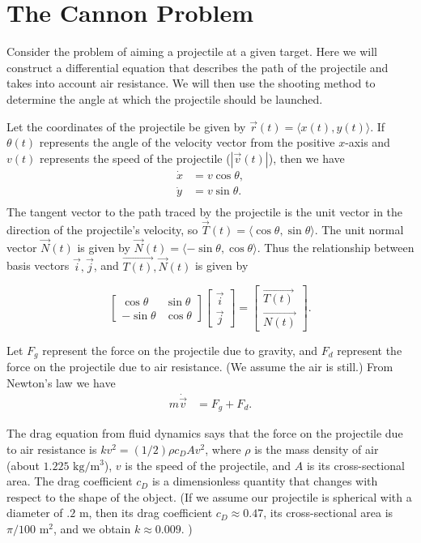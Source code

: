 
\section{The Cannon Problem}

Consider the problem of aiming a projectile at a given target. Here we will construct a differential equation that describes the path of the projectile and takes into account air resistance. We will then use the shooting method to determine the angle at which the projectile should be launched. 

Let the coordinates of the projectile be given by $\vec{r}(t) = \langle x(t), y(t) \rangle.$ If $\theta(t)$ represents the angle of the velocity vector from the positive $x$-axis and $v(t)$ represents the speed of the projectile ($ |\vec{v}(t) |$), then we have 
\begin{align*}
\dot{x} &= v\cos{\theta},\\
\dot{y} &= v\sin{\theta}.\\
\end{align*}
The tangent vector to the path traced by the projectile is the unit vector in the direction of the projectile's velocity, so $\vec{T}(t) = \langle \cos{\theta}, \sin{\theta} \rangle.$ The unit normal vector $\vec{N} (t)$ is given by $\vec{N} (t)= \langle -\sin{\theta}, \cos{\theta} \rangle.$ Thus the relationship between basis vectors $\vec{i}, \vec{j}$, and $\vec{T(t)}, \vec{N}(t)$ is given by 

\[
\left[\begin{array}{cc}\cos{\theta} & \sin{\theta} \\-\sin{\theta} & \cos{\theta}\end{array}\right] \left[\begin{array}{c}\vec{i} \\\vec{j}\end{array}\right] = \left[\begin{array}{c}\vec{T(t)} \\\vec{N(t)}\end{array}\right]
.\]


Let $F_g$ represent the force on the projectile due to gravity, and $F_d$ represent the force on the projectile due to air resistance. (We assume the air is still.) From Newton's law we have
\begin{align*}
m \dot{\vec{v}} &= F_g + F_d.
\end{align*}

The drag equation from fluid dynamics says that the force on the projectile due to air resistance is $k v^2 = (1/2)\rho c_D A v^2$, where $\rho$ is the mass density of air (about $1.225$ $\text{kg}/\text{m}^3$), $v$ is the speed of the projectile, and $A$ is its cross-sectional area.  The drag coefficient $c_D$ is a dimensionless quantity that changes with respect to the shape of the object. (If we assume our projectile is spherical with a diameter of $.2$ m, then its drag coefficient $c_D \approx 0.47$, its cross-sectional area is $\pi/100$ $ \text{m}^2$, and we obtain $k \approx 0.009.$ )


